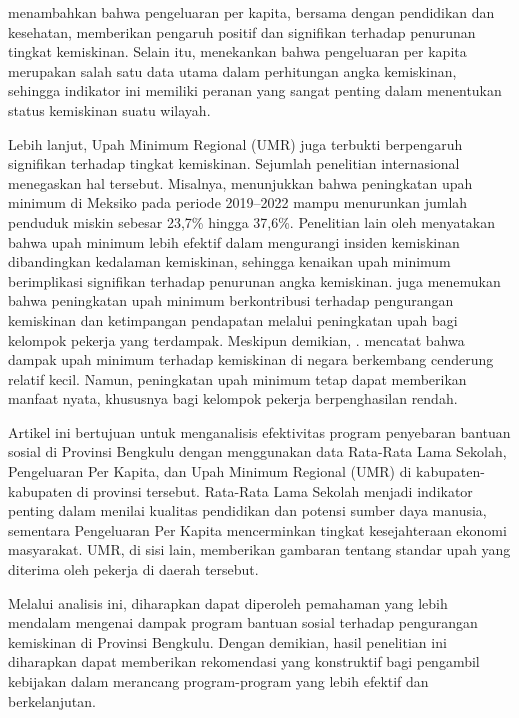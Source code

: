 \documentclass[12pt,a4paper]{article}
\begin{document}
\begin{multicols}{2}
\cite{rabbani2025analisis} menambahkan bahwa pengeluaran per kapita, bersama dengan pendidikan dan kesehatan, memberikan pengaruh positif dan signifikan terhadap penurunan tingkat kemiskinan. Selain itu, \cite{nugroho2020leading} menekankan bahwa pengeluaran per kapita merupakan salah satu data utama dalam perhitungan angka kemiskinan, sehingga indikator ini memiliki peranan yang sangat penting dalam menentukan status kemiskinan suatu wilayah.


Lebih lanjut, Upah Minimum Regional (UMR) juga terbukti berpengaruh signifikan terhadap tingkat kemiskinan. Sejumlah penelitian internasional menegaskan hal tersebut. Misalnya,\cite{munguia2024minimum} menunjukkan bahwa peningkatan upah minimum di Meksiko pada periode 2019–2022 mampu menurunkan jumlah penduduk miskin sebesar 23,7\% hingga 37,6\%. Penelitian lain oleh \cite{dantas2025non} menyatakan bahwa upah minimum lebih efektif dalam mengurangi insiden kemiskinan dibandingkan kedalaman kemiskinan, sehingga kenaikan upah minimum berimplikasi signifikan terhadap penurunan angka kemiskinan. \cite{alaniz2011impact} juga menemukan bahwa peningkatan upah minimum berkontribusi terhadap pengurangan kemiskinan dan ketimpangan pendapatan melalui peningkatan upah bagi kelompok pekerja yang terdampak. Meskipun demikian, \cite{bassier2024can}. mencatat bahwa dampak upah minimum terhadap kemiskinan di negara berkembang cenderung relatif kecil. Namun, peningkatan upah minimum tetap dapat memberikan manfaat nyata, khususnya bagi kelompok pekerja berpenghasilan rendah.


Artikel ini bertujuan untuk menganalisis efektivitas program penyebaran bantuan sosial di Provinsi Bengkulu dengan menggunakan data Rata-Rata Lama Sekolah, Pengeluaran Per Kapita, dan Upah Minimum Regional (UMR) di kabupaten-kabupaten di provinsi tersebut. Rata-Rata Lama Sekolah menjadi indikator penting dalam menilai kualitas pendidikan dan potensi sumber daya manusia, sementara Pengeluaran Per Kapita mencerminkan tingkat kesejahteraan ekonomi masyarakat. UMR, di sisi lain, memberikan gambaran tentang standar upah yang diterima oleh pekerja di daerah tersebut.

Melalui analisis ini, diharapkan dapat diperoleh pemahaman yang lebih mendalam mengenai dampak program bantuan sosial terhadap pengurangan kemiskinan di Provinsi Bengkulu. Dengan demikian, hasil penelitian ini diharapkan dapat memberikan rekomendasi yang konstruktif bagi pengambil kebijakan dalam merancang program-program yang lebih efektif dan berkelanjutan.




\end{multicols}
\end{document}

